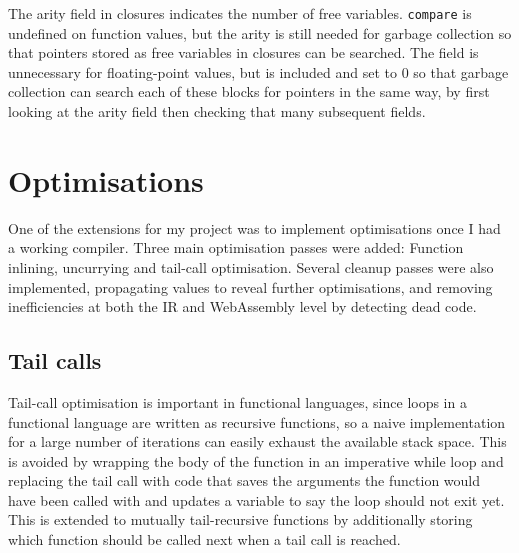 The arity field in closures indicates the number of free variables. \verb|compare| is undefined on function values, but the arity is still needed for garbage collection so that pointers stored as free variables in closures can be searched. The field is unnecessary for floating-point values, but is included and set to 0 so that garbage collection can search each of these blocks for pointers in the same way, by first looking at the arity field then checking that many subsequent fields. %


\section{Optimisations}

One of the extensions for my project was to implement optimisations once I had a working compiler. Three main optimisation passes were added: Function inlining, uncurrying and tail-call optimisation. Several cleanup passes were also implemented, propagating values to reveal further optimisations, and removing inefficiencies at both the IR and WebAssembly level by detecting dead code.

\subsection{Tail calls}
Tail-call optimisation is important in functional languages, since loops in a functional language are written as recursive functions, so a naive implementation for a large number of iterations can easily exhaust the available stack space. This is avoided by wrapping the body of the function in an imperative while loop and replacing the tail call with code that saves the arguments the function would have been called with and updates a variable to say the loop should not exit yet. This is extended to mutually tail-recursive functions by additionally storing which function should be called next when a tail call is reached.

